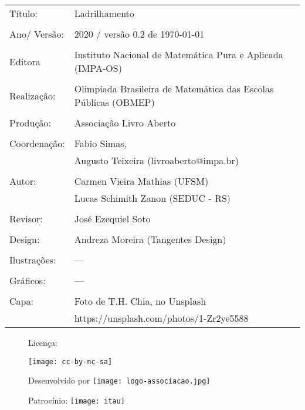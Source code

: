 \begin{tabular}{p{}p{}}
Título: & Ladrilhamento\\
\\
Ano/ Versão: & 2020 / versão 0.2 de \today\\
\\
Editora & Instituto Nacional de Matem\'atica Pura e Aplicada (IMPA-OS)\\
\\
Realização:& Olimp\'iada Brasileira de Matem\'atica das Escolas P\'ublicas (OBMEP)\\
\\
Produção:& Associação Livro Aberto\\
\\
Coordenação: & Fabio Simas, \\
			&  Augusto Teixeira (livroaberto@impa.br)\\
\\
  Autor: & Carmen Vieira Mathias (UFSM) \\
         & Lucas Schimith Zanon (SEDUC - RS) \\
\\
Revisor: & José Ezequiel Soto  \\
\\
Design: & Andreza Moreira (Tangentes Design) \\
\\
  Ilustrações: & --- \\ 
\\
Gráficos: & --- \\
\\
  Capa: & Foto de T.H. Chia, no Unsplash \\
  		& https://unsplash.com/photos/1-Zr2ye5588 \\

\end{tabular}


\begin{figure}[b]
\begin{minipage}[l]{5cm}
\centering

{\large Licença:}

  \texttt{[image: cc-by-nc-sa]}
\end{minipage}\hfill
\begin{minipage}[c]{5cm}
\centering
{\large Desenvolvido por}
\texttt{[image: logo-associacao.jpg]}
\end{minipage}
\begin{minipage}[r]{5cm}
\centering

{\large Patrocínio:}
  \vspace{1em}
  \texttt{[image: itau]}
\end{minipage}
\end{figure}

